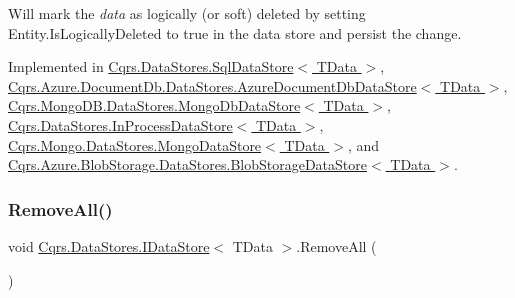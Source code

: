 Will mark the {\itshape data}  as logically (or soft) deleted by setting Entity.\+Is\+Logically\+Deleted to true in the data store and persist the change. 



Implemented in \hyperlink{classCqrs_1_1DataStores_1_1SqlDataStore_a898d15db199f054865a96ac646bf54fb_a898d15db199f054865a96ac646bf54fb}{Cqrs.\+Data\+Stores.\+Sql\+Data\+Store$<$ T\+Data $>$}, \hyperlink{classCqrs_1_1Azure_1_1DocumentDb_1_1DataStores_1_1AzureDocumentDbDataStore_abf9bcf75e8e0e1ec86155bf4da1a7b7a_abf9bcf75e8e0e1ec86155bf4da1a7b7a}{Cqrs.\+Azure.\+Document\+Db.\+Data\+Stores.\+Azure\+Document\+Db\+Data\+Store$<$ T\+Data $>$}, \hyperlink{classCqrs_1_1MongoDB_1_1DataStores_1_1MongoDbDataStore_a14b43546e8d1e1832358e1cf2f8535f1_a14b43546e8d1e1832358e1cf2f8535f1}{Cqrs.\+Mongo\+D\+B.\+Data\+Stores.\+Mongo\+Db\+Data\+Store$<$ T\+Data $>$}, \hyperlink{classCqrs_1_1DataStores_1_1InProcessDataStore_a43a93c614a403181e0641106ca9509d6_a43a93c614a403181e0641106ca9509d6}{Cqrs.\+Data\+Stores.\+In\+Process\+Data\+Store$<$ T\+Data $>$}, \hyperlink{classCqrs_1_1Mongo_1_1DataStores_1_1MongoDataStore_a64003d01de3ac6ffd0e41bb7f572bf96_a64003d01de3ac6ffd0e41bb7f572bf96}{Cqrs.\+Mongo.\+Data\+Stores.\+Mongo\+Data\+Store$<$ T\+Data $>$}, and \hyperlink{classCqrs_1_1Azure_1_1BlobStorage_1_1DataStores_1_1BlobStorageDataStore_af054d4134671d66981c4d91df5c1d481_af054d4134671d66981c4d91df5c1d481}{Cqrs.\+Azure.\+Blob\+Storage.\+Data\+Stores.\+Blob\+Storage\+Data\+Store$<$ T\+Data $>$}.

\mbox{\label{interfaceCqrs_1_1DataStores_1_1IDataStore_aead8d7a39a717d29af05daf7b64bea94_aead8d7a39a717d29af05daf7b64bea94}} 
\subsubsection{\texorpdfstring{Remove\+All()}{RemoveAll()}}
{\footnotesize\ttfamily void \hyperlink{interfaceCqrs_1_1DataStores_1_1IDataStore}{Cqrs.\+Data\+Stores.\+I\+Data\+Store}$<$ T\+Data $>$.Remove\+All (\begin{DoxyParamCaption}{ }\end{DoxyParamCaption})}



